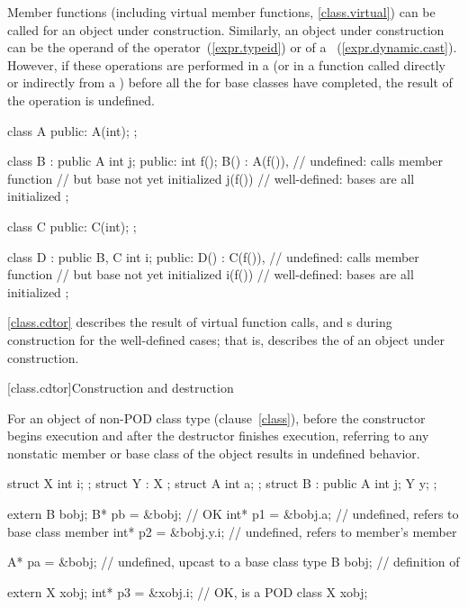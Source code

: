 \pnum
{}%
Member functions (including virtual member functions, \ref{class.virtual}) can be
called for an object under construction.
Similarly, an object under construction can be the operand of the
operator~(\ref{expr.typeid}) or of a
~(\ref{expr.dynamic.cast}).
However, if these operations are performed in a
(or in a function called directly or indirectly from a
)
before all the
for base classes have completed, the result of the operation is undefined.
\enterexample

\begin{codeblock}
class A {
public:
	A(int);
};

class B : public A {
	int j;
public:
	int f();
	B() : A(f()),		// undefined: calls member function
				// but base  not yet initialized
	j(f()) { }		// well-defined: bases are all initialized
};

class C {
public:
	C(int);
};

class D : public B, C {
	int i;
public:
	D() : C(f()),		// undefined: calls member function
				// but base  not yet initialized
	i(f()) { }		// well-defined: bases are all initialized
};
\end{codeblock}
\exitexampleb

\pnum
\enternote
\ref{class.cdtor} describes the result of virtual function calls,
and
s
during construction for the well-defined cases;
that is, describes the
of an object under construction.
\exitnote%

[class.cdtor]{Construction and destruction}%
%

\pnum
{}%
%
For an object of non-POD class type (clause~\ref{class}),
before the constructor begins execution and after the destructor finishes
execution, referring to
any nonstatic member or base class of the object results in undefined behavior.
\enterexample

\begin{codeblock}
struct X { int i; };
struct Y : X { };
struct A { int a; };
struct B : public A { int j; Y y; };

extern B bobj;
B* pb = &bobj;                  // OK
int* p1 = &bobj.a;              // undefined, refers to base class member
int* p2 = &bobj.y.i;            // undefined, refers to member's member

A* pa = &bobj;                  // undefined, upcast to a base class type
B bobj;                         // definition of 

extern X xobj;
int* p3 = &xobj.i;              // OK,  is a POD class
X xobj;
\end{codeblock}

